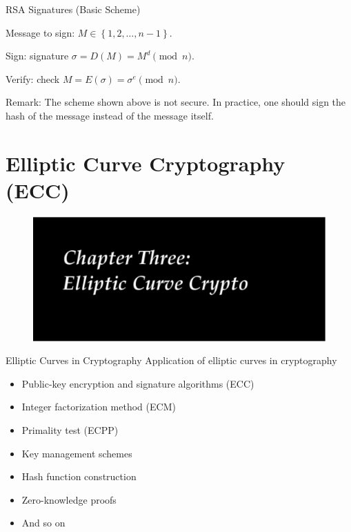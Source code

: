 \documentclass{beamer}
\begin{document}
\begin{frame}{RSA Signatures (Basic Scheme)}

\begin{block}{}
Message to sign: $M \in\left\{1, 2, \ldots, n-1\right\}$.

Sign: signature $\sigma = D(M) = M^d \pmod{n}$.

Verify: check $M = E(\sigma) = \sigma^e \pmod{n}$.
\end{block}

Remark: The scheme shown above is not secure.  In practice, one should
sign the hash of the message instead of the message itself.

\end{frame}

\section{Elliptic Curve Cryptography (ECC)}
\begin{frame}{}
\begin{figure}[htbp]
\centering
  \includegraphics[width=\textwidth]{img/chap3-ecc.pdf}
\end{figure}
\end{frame}

\begin{frame}{Elliptic Curves in Cryptography}
Application of elliptic curves in cryptography
\begin{itemize}
\item<1-> Public-key encryption and signature algorithms (ECC)
\item<2-> Integer factorization method (ECM)\quad~\cite{Lenstra1987}
\item<3-> Primality test (ECPP)\quad~\cite{AdHu1987}
\item<4-> Key management schemes\quad~\cite{BeShWa2008}
\item<5-> Hash function construction\quad~\cite{ChGoLa2007}
\item<6-> Zero-knowledge proofs
\item<7-> And so on
\end{itemize}
\end{frame}
\end{document}
